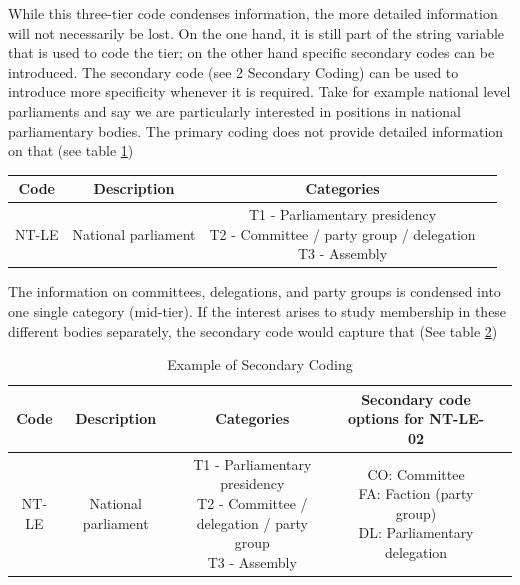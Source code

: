 \documentclass{article}
\begin{document}
While this three-tier code condenses information, the more detailed information will not necessarily be lost. On the one hand, it is still part of the string variable that is used to code the tier; on the other hand specific secondary codes can be introduced. The secondary code (see 2 Secondary Coding) can be used to introduce more specificity whenever it is required. Take for example national level parliaments and say we are particularly interested in positions in national parliamentary bodies. The primary coding does not provide detailed information on that (see table \ref{nt_le_example})

\begin{table}[H]
\begin{center}
 \begin{tabular}{|c|c|c|} 
 \hline
 Code & Description & Categories \\ [0.5ex] 
 \hline\hline
 NT-LE & 
 National parliament & 
  \makecell*{
         T1 - Parliamentary presidency \\
         T2 - Committee / party group / delegation \\
         T3 - Assembly \\
        } &
 \hline
 \end{tabular}
 \label{nt_le_example}
\end{center}
\end{table}

The information on committees, delegations, and party groups is condensed into one single category (mid-tier). If the interest arises to study membership in these different bodies separately, the secondary code would capture that (See table \ref{SecC})

\begin{table}[H]
\begin{center}
 \begin{tabular}{|c|c|c|c|} 
 \hline
 Code & Description & Categories & Secondary code options for NT-LE-02 \\ [0.5ex] 
 \hline\hline
 NT-LE & 
 National parliament & 
    
    \makecell*{
         T1 - Parliamentary presidency \\
         T2 - Committee / delegation / party group \\
         T3 - Assembly \\
        } &
    
    \makecell*{
         CO: Committee \\
         FA: Faction (party group) \\
         DL: Parliamentary delegation \\
        } &
 \hline
 \end{tabular}\caption{Example of Secondary Coding}\label{SecC}
\end{center}
\end{table}
\end{document}
